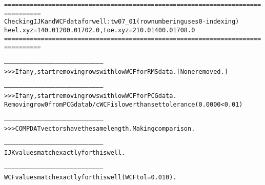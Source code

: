 \begin{alltt}
================================================================================
Checking IJK and WCF data for well: tw07_01 (row numbering uses 0-indexing)
heel.xyz = 140.0 1200.0 1702.0, toe.xyz = 210.0 1400.0 1708.0
================================================================================

--------------------------------------------------------------------------------
>>> If any, start removing rows with low WCF for RMS data. [None removed.]

--------------------------------------------------------------------------------
>>> If any, start removing rows with low WCF for PCG data.
Removing row 0 from PCG data b/c WCF is lower than set tolerance (0.0000 < 0.01)

--------------------------------------------------------------------------------
>>> COMPDAT vectors have the same length. Making comparison.

--------------------------------------------------------------------------------
IJK values match exactly for this well.

--------------------------------------------------------------------------------
WCF values match exactly for this well (WCF tol = 0.010).
\end{alltt}
